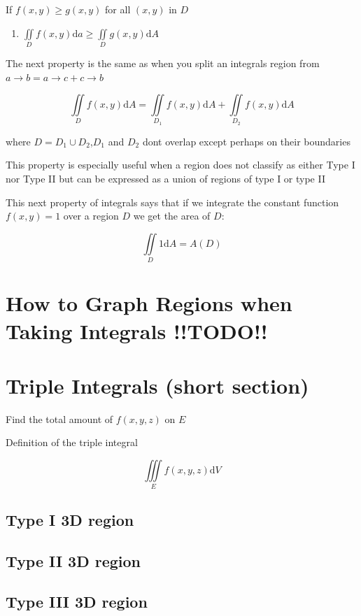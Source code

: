 \documentclass{article}
\begin{document}
If $f(x,y) \geq g(x,y)$ for all $(x,y)$ in $D$

\begin{enumerate}
    \item $\iint\limits_{D} f(x,y) \mathrm{d}a \geq \iint\limits_{D}g(x,y) \mathrm{d}A$
\end{enumerate}

The next property is the same as when you split an integrals region from $a \rightarrow b  = a \rightarrow c + c \rightarrow b$

$$\iint\limits_{D}f(x,y)\mathrm{d}A = \iint\limits_{D_1}f(x,y)\mathrm{d}A + \iint\limits_{D_2}f(x,y)\mathrm{d}A$$

where $D = D_1 \cup D_2 $,$D_1$ and $D_2$ dont overlap except perhaps on their boundaries

This property is especially useful when a region does not classify as either Type I nor Type II but can be expressed as a union of regions of type I or type II

This next property of integrals says that if we integrate the constant function $f(x,y) = 1$ over a region $D$ we get the area of $D$:

$$\iint\limits_{D}1\mathrm{d}A = A(D)$$

\newpage
\section{How to Graph Regions when Taking Integrals !!TODO!!}

\section{Triple Integrals (short section)}

    Find the total amount of $f(x,y,z)$ on $E$

    Definition of the triple integral

    $$\iiint\limits_{E}f(x,y,z)\mathrm{d}V$$

    \subsection{Type I 3D region}

    \subsection{Type II 3D region}

    \subsection{Type III 3D region}
\end{document}
